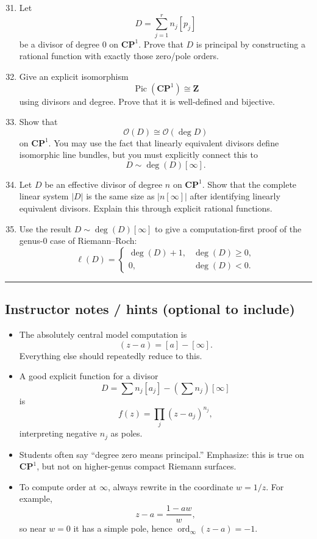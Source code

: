 \documentclass[11pt,openany]{article}
\begin{document}
\begin{enumerate}
	\setcounter{enumi}{30}
	
	\item Let
	\[
	D=\sum_{j=1}^r n_j[p_j]
	\]
	be a divisor of degree \(0\) on \(\mathbf{CP}^1\). Prove that \(D\) is principal by constructing a rational function with exactly those zero/pole orders.
	
	\item Give an explicit isomorphism
	\[
	\operatorname{Pic}(\mathbf{CP}^1)\cong \mathbf{Z}
	\]
	using divisors and degree. Prove that it is well-defined and bijective.
	
	\item Show that
	\[
	\mathcal{O}(D)\cong \mathcal{O}(\deg D)
	\]
	on \(\mathbf{CP}^1\).  
	You may use the fact that linearly equivalent divisors define isomorphic line bundles, but you must explicitly connect this to
	\[
	D\sim \deg(D)[\infty].
	\]
	
	\item Let \(D\) be an effective divisor of degree \(n\) on \(\mathbf{CP}^1\). Show that the complete linear system \(|D|\) is the same size as \(|n[\infty]|\) after identifying linearly equivalent divisors. Explain this through explicit rational functions.
	
	\item Use the result \(D\sim \deg(D)[\infty]\) to give a computation-first proof of the genus-\(0\) case of Riemann--Roch:
	\[
	\ell(D)=
	\begin{cases}
		\deg(D)+1,& \deg(D)\ge 0,\\
		0,& \deg(D)<0.
	\end{cases}
	\]
\end{enumerate}

\bigskip
\hrule
\bigskip

\subsection*{Instructor notes / hints (optional to include)}

\begin{itemize}
	\item The absolutely central model computation is
	\[
	(z-a)=[a]-[\infty].
	\]
	Everything else should repeatedly reduce to this.
	
	\item A good explicit function for a divisor
	\[
	D=\sum n_j[a_j]-\left(\sum n_j\right)[\infty]
	\]
	is
	\[
	f(z)=\prod_j (z-a_j)^{n_j},
	\]
	interpreting negative \(n_j\) as poles.
	
	\item Students often say ``degree zero means principal.''  
	Emphasize: this is true on \(\mathbf{CP}^1\), but not on higher-genus compact Riemann surfaces.
	
	\item To compute order at \(\infty\), always rewrite in the coordinate \(w=1/z\).  
	For example,
	\[
	z-a=\frac{1-aw}{w},
	\]
	so near \(w=0\) it has a simple pole, hence \(\operatorname{ord}_\infty(z-a)=-1\).
\end{itemize}
\end{document}
